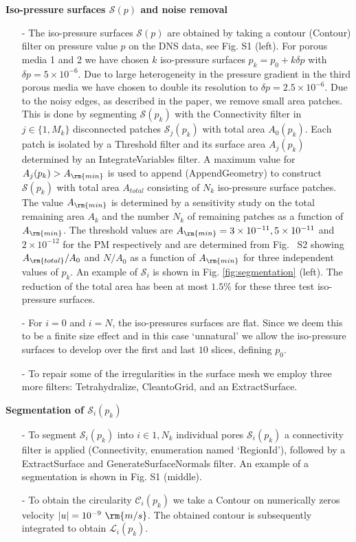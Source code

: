 \documentclass[draft,jgrga]{agutexSI2019}
\begin{document}
\begin{article}
\noindent\textbf{Iso-pressure surfaces $\mathcal{S}(p)$ and noise removal}
\begin{itemize}
	\item[-]The iso-pressure surfaces $\mathcal{S}(p)$ are obtained by taking a contour (Contour) filter on pressure value $p$ on the DNS data, see Fig. S1 (left). For porous media 1 and 2 we have chosen $k$ iso-pressure surfaces $p_k = p_0+ k \delta p$ with $ \delta p= 5\times 10^{-6}$. Due to large heterogeneity in the pressure gradient in the third porous media we have chosen to double its resolution to $\delta p = 2.5\times 10^{-6}$. Due to the noisy edges, as described in the paper, we remove small area patches. This is done by segmenting $\mathcal{S}(p_k)$ with the Connectivity filter in $j\in \{1,M_k\}$ disconnected patches $\mathcal{S}_j(p_k)$ with total area $A_0(p_k)$. Each patch is isolated by a Threshold filter and its surface area $A_j(p_k)$ determined by an IntegrateVariables filter. A maximum value for $A_j(p_k)> A_{\rm{min}}$ is used to append (AppendGeometry) to construct $\mathcal{S}(p_k)$ with total area $A_{total}$ consisting of $N_k$ iso-pressure surface patches. The value  $A_{\rm{min}}$ is determined by a sensitivity study on the total remaining area $A_k$ and the number $N_k$ of remaining patches as a function of $ A_{\rm{min}}$. The threshold values are $A_{\rm{min}} = 3\times10^{-11}, 5\times10^{-11} $ and $2\times10^{-12}$ for the PM respectively and are determined from Fig.~ S2 showing $A_{\rm{total}}/A_0$ and $N/A_0$ as a function of $A_{\rm{min}}$ for three independent values of $p_k$. An example of $\mathcal{S}_i$ is shown in Fig. \ref{fig:segmentation} (left). The reduction of the total area has been at most $1.5\%$ for these three test iso-pressure surfaces.
	\item[-]For $i=0$ and $i=N$, the iso-pressures surfaces are flat. Since we deem this to be a finite size effect and in this case `unnatural' we allow the iso-pressure surfaces to develop over the first and last $10$ slices, defining $p_0$.
	\item[-]To repair some of the irregularities in the surface mesh we employ three more filters: Tetrahydralize, CleantoGrid, and an ExtractSurface.
\end{itemize}
\noindent\textbf{Segmentation of $\mathcal{S}_i(p_k)$}
\begin{itemize} 
	\item[-]To segment $\mathcal{S}_i(p_k)$ into $i\in{1,N_k}$ individual pores $\mathcal{S}_i(p_k)$ a connectivity filter is applied (Connectivity, enumeration named `RegionId'), followed by a ExtractSurface and GenerateSurfaceNormals filter. An example of a segmentation is shown in Fig. S1 (middle).
	\item[-] To obtain the circularity $\mathcal{C}_i(p_k)$ we take a Contour on numerically zeros velocity $|u|= 10^{-9}~\rm{m/s}$. The obtained contour is subsequently integrated to obtain $\mathcal{L}_i(p_k)$. 


\end{itemize}
\end{article}
\end{document}
